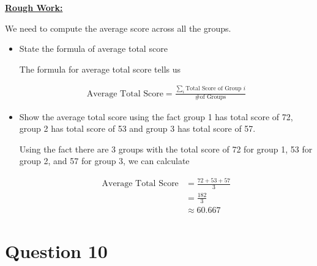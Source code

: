 \documentclass[12pt]{article}
\begin{document}
\begin{mdframed}
    \underline{\textbf{Rough Work:}}

    \bigskip

    We need to compute the average score across all the groups.

    \bigskip

    \begin{itemize}
        \item State the formula of average total score
        \begin{mdframed}
            The formula for average total score tells us

            \begin{align}
                \text{Average Total Score} = \frac{\sum\limits_{i} \text{Total Score of Group } i}{\text{\# of Groups}}
            \end{align}
        \end{mdframed}

        \item Show the average total score using the fact group 1 has total score of 72,
        group 2 has total score of 53 and group 3 has total score of 57.

        \begin{mdframed}
            Using the fact there are 3 groups with the total score of 72 for group 1,
            53 for group 2, and 57 for group 3, we can calculate

            \begin{align}
                \text{Average Total Score} &= \frac{72 + 53 + 57}{3}\\
                &= \frac{182}{3}\\
                &\approx 60.667
            \end{align}
        \end{mdframed}
    \end{itemize}

\end{mdframed}

\section*{Question 10}

\bigskip
\end{document}

